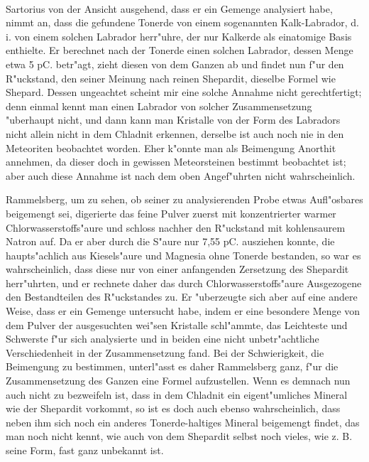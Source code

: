 \documentclass[a4paper, 11pt, oneside]{article}
\begin{document}
\paragraph{}
Sartorius von der Ansicht ausgehend, dass er ein Gemenge analysiert habe, nimmt an, dass die gefundene Tonerde von einem sogenannten Kalk-Labrador, d. i. von einem solchen Labrador herr"uhre, der nur Kalkerde als einatomige Basis enthielte. Er berechnet nach der Tonerde einen solchen Labrador, dessen Menge etwa 5 pC. betr"agt, zieht diesen von dem Ganzen ab und findet nun f"ur den R"uckstand, den seiner Meinung nach reinen Shepardit, dieselbe Formel wie Shepard. Dessen ungeachtet scheint mir eine solche Annahme nicht gerechtfertigt; denn einmal kennt man einen Labrador von solcher Zusammensetzung "uberhaupt nicht, und dann kann man Kristalle von der Form des Labradors nicht allein nicht in dem Chladnit erkennen, derselbe ist auch noch nie in den Meteoriten beobachtet worden. Eher k"onnte man als Beimengung Anorthit annehmen, da dieser doch in gewissen Meteorsteinen bestimmt beobachtet ist; aber auch diese Annahme ist nach dem oben Angef"uhrten nicht wahrscheinlich.

Rammelsberg, um zu sehen, ob seiner zu analysierenden Probe etwas Aufl"osbares beigemengt sei, digerierte das feine Pulver zuerst mit konzentrierter warmer Chlorwasserstoffs"aure und schloss nachher den R"uckstand mit kohlensaurem Natron auf. Da er aber durch die S"aure nur 7,55 pC. ausziehen konnte, die haupts"achlich aus Kiesels"aure und Magnesia ohne Tonerde bestanden, so war es wahrscheinlich, dass diese nur von einer anfangenden Zersetzung des Shepardit herr"uhrten, und er rechnete daher das durch Chlorwasserstoffs"aure Ausgezogene den Bestandteilen des R"uckstandes zu. Er "uberzeugte sich aber auf eine andere Weise, dass er ein Gemenge untersucht habe, indem er eine besondere Menge von dem Pulver der ausgesuchten wei"sen Kristalle schl"ammte, das Leichteste und Schwerste f"ur sich analysierte und in beiden eine nicht unbetr"achtliche Verschiedenheit in der Zusammensetzung fand. Bei der Schwierigkeit, die Beimengung zu bestimmen, unterl"asst es daher Rammelsberg ganz, f"ur die Zusammensetzung des Ganzen eine Formel aufzustellen. Wenn es demnach nun auch nicht zu bezweifeln ist, dass in dem Chladnit ein eigent"umliches Mineral wie der Shepardit vorkommt, so ist es doch auch ebenso wahrscheinlich, dass neben ihm sich noch ein anderes Tonerde-haltiges Mineral beigemengt findet, das man noch nicht kennt, wie auch von dem Shepardit selbst noch vieles, wie z. B. seine Form, fast ganz unbekannt ist.
\end{document}

